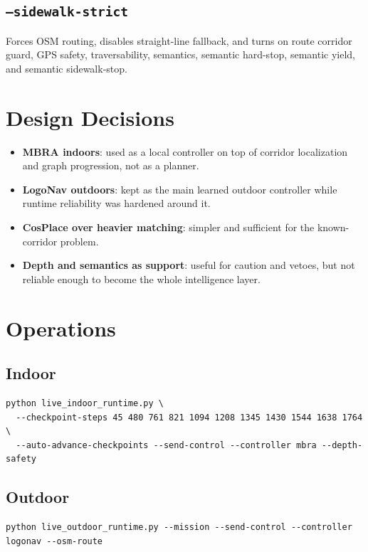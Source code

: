 \documentclass[11pt]{article}
\begin{document}
\subsection*{\texttt{--sidewalk-strict}}

Forces OSM routing, disables straight-line fallback, and turns on route corridor
guard, GPS safety, traversability, semantics, semantic hard-stop, semantic yield,
and semantic sidewalk-stop.

\section{Design Decisions}

\begin{itemize}[nosep]
  \item \textbf{MBRA indoors}: used as a local controller on top of corridor
  localization and graph progression, not as a planner.
  \item \textbf{LogoNav outdoors}: kept as the main learned outdoor controller while
  runtime reliability was hardened around it.
  \item \textbf{CosPlace over heavier matching}: simpler and sufficient for the
  known-corridor problem.
  \item \textbf{Depth and semantics as support}: useful for caution and vetoes, but
  not reliable enough to become the whole intelligence layer.
\end{itemize}

\section{Operations}

\subsection*{Indoor}

\begin{verbatim}
python live_indoor_runtime.py \
  --checkpoint-steps 45 480 761 821 1094 1208 1345 1430 1544 1638 1764 \
  --auto-advance-checkpoints --send-control --controller mbra --depth-safety
\end{verbatim}

\subsection*{Outdoor}

\begin{verbatim}
python live_outdoor_runtime.py --mission --send-control --controller logonav --osm-route
\end{verbatim}
\end{document}
